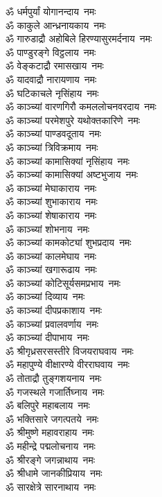 \begin{multicols}{2}
\begin{flushleft}
ॐ धर्मपुर्यां योगानन्दाय~नमः\\
ॐ काकुले आन्ध्रनायकाय~नमः\\
ॐ गारुडाद्रौ अहोबिले हिरण्यासुरमर्दनाय~नमः\\
ॐ पाण्डुरङ्गे विट्ठलाय~नमः\\
ॐ वेङ्कटाद्रौ रमासखाय~नमः\hfill{}\\
ॐ यादवाद्रौ नारायणाय~नमः\\
ॐ घटिकाचले नृसिंहाय~नमः\\
ॐ काञ्च्यां वारणगिरौ कमललोचनवरदाय~नमः\\
ॐ काञ्च्यां परमेशपुरे यथोक्तकारिणे~नमः\\
ॐ काञ्च्यां पाण्डवदूताय~नमः\\
ॐ काञ्च्यां त्रिविक्रमाय~नमः\\
ॐ काञ्च्यां कामासिक्यां नृसिंहाय~नमः\\
ॐ काञ्च्यां कामासिक्यां अष्टभुजाय~नमः\\
ॐ काञ्च्यां मेघाकाराय~नमः\\
ॐ काञ्च्यां शुभाकाराय~नमः\hfill{}\\
ॐ काञ्च्यां शेषाकाराय~नमः\\
ॐ काञ्च्यां शोभनाय~नमः\\
ॐ काञ्च्यां कामकोट्यां शुभप्रदाय~नमः\\
ॐ काञ्च्यां कालमेघाय~नमः\\
ॐ काञ्च्यां खगारूढाय~नमः\\
ॐ काञ्च्यां कोटिसूर्यसमप्रभाय~नमः\\
ॐ काञ्च्यां दिव्याय~नमः\\
ॐ काञ्च्यां दीपप्रकाशाय~नमः\\
ॐ काञ्च्यां प्रवालवर्णाय~नमः\\
ॐ काञ्च्यां दीपाभाय~नमः\hfill{}\\
ॐ श्रीगृध्रसरसस्तीरे विजयराघवाय~नमः\\
ॐ महापुण्ये वीक्षारण्ये वीरराघवाय~नमः\\
ॐ तोताद्रौ तुङ्गशयनाय~नमः\\
ॐ गजस्थले गजार्तिघ्नाय~नमः\\
ॐ बलिपुरे महाबलाय~नमः\\
ॐ भक्तिसारे जगत्पतये~नमः\\
ॐ श्रीमुष्णे महावराहाय~नमः\\
ॐ महीन्द्रे पद्मलोचनाय~नमः\\
ॐ श्रीरङ्गे जगन्नाथाय~नमः\\
ॐ श्रीधामे जानकीप्रियाय~नमः\hfill{}\\
ॐ सारक्षेत्रे सारनाथाय~नमः\\

\end{flushleft}
\end{multicols}
